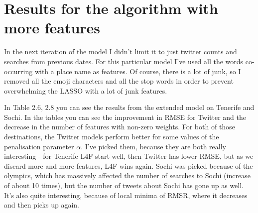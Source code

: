 \documentclass[minf,frontabs,twoside,singlespacing,parskip]{infthesis}
\begin{document}

\newpage
\section{Results for the algorithm with more features}

In the next iteration of the model I didn't limit it to just twitter counts and searches from previous dates. For this particular model I've used all the words co-occurring with a place name as features. Of course, there is a lot of junk, so I removed all the emoji characters and all the stop words in order to prevent overwhelming the LASSO with a lot of junk features.

In Table 2.6, 2.8 you can see the results from the extended model on Tenerife and Sochi. In the tables you can see the improvement in RMSE for Twitter and the decrease in the number of features with non-zero weights. For both of those destinations, the Twitter models perform better for some values of the penalisation parameter $\alpha$. I've picked them, because they are both really interesting - for Tenerife L4F start well, then Twitter has lower RMSE, but as we discard more and more features, L4F wins again. Sochi was picked because of the olympics, which has massively affected the number of searches to Sochi (increase of about 10 times), but the number of tweets about Sochi has gone up as well. 
It's also quite interesting, because of local minima of RMSR, where it decreases and then picks up again.
\end{document}
